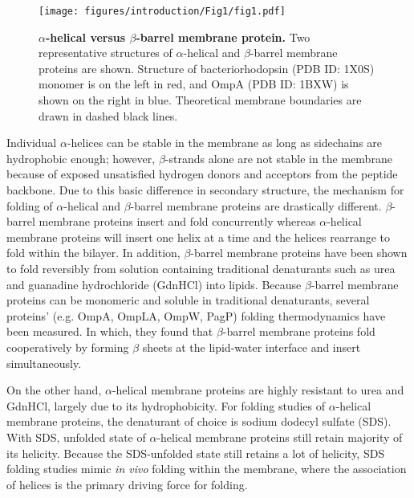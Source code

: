 \begin{figure}[!ht]
\begin{center}
	\texttt{[image: figures/introduction/Fig1/fig1.pdf]}
\end{center}
	\caption{\textbf{$\alpha$-helical versus $\beta$-barrel membrane protein.} Two representative structures of $\alpha$-helical and $\beta$-barrel membrane proteins are shown. Structure of bacteriorhodopsin (PDB ID: 1X0S) monomer is on the left in red, and OmpA (PDB ID: 1BXW) is shown on the right in blue. Theoretical membrane boundaries are drawn in dashed black lines.}
	\label{fig:intro_f1}
\end{figure}

Individual $\alpha$-helices can be stable in the membrane as long as sidechains are hydrophobic enough; however, $\beta$-strands alone are not stable in the membrane because of exposed unsatisfied hydrogen donors and acceptors from the peptide backbone. Due to this basic difference in secondary structure, the mechanism for folding of $\alpha$-helical and $\beta$-barrel membrane proteins are drastically different. $\beta$-barrel membrane proteins insert and fold concurrently whereas $\alpha$-helical membrane proteins will insert one helix at a time and the helices rearrange to fold within the bilayer. In addition, $\beta$-barrel membrane proteins have been shown to fold reversibly from solution containing traditional denaturants such as urea and guanadine hydrochloride (GdnHCl) into lipids. \cite{moon2011, moon2011pnas, moon2013, pocanschi2006, sanchez2008, huysmans2010, hong2004} Because $\beta$-barrel membrane proteins can be monomeric and soluble in traditional denaturants, several proteins' (e.g. OmpA, OmpLA, OmpW, PagP) folding thermodynamics have been measured. \cite{sanchez2008, moon2011, moon2011pnas, moon2013} In which, they found that $\beta$-barrel membrane proteins fold cooperatively by forming $\beta$ sheets at the lipid-water interface and insert simultaneously. 

On the other hand, $\alpha$-helical membrane proteins are highly resistant to urea and GdnHCl, largely due to its hydrophobicity. For folding studies of $\alpha$-helical membrane proteins, the denaturant of choice is sodium dodecyl sulfate (SDS). With SDS, unfolded state of $\alpha$-helical membrane proteins still retain majority of its helicity. \cite{chill2007, booth1995, curnow2007, paslawski2015} Because the SDS-unfolded state still retains a lot of helicity, SDS folding studies mimic \textit{in vivo} folding within the membrane, where the association of helices is the primary driving force for folding. 

